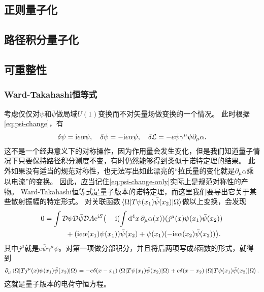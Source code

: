 \subsection{正则量子化}

\subsection{路径积分量子化}

\subsection{可重整性}

\subsubsection{Ward-Takahashi恒等式}

考虑仅仅对$\psi$和$\bar{\psi}$做局域$U(1)$变换而不对矢量场做变换的一个情况。
此时根据\eqref{eq:psi-change}，有
\begin{equation}
    \var{\psi} = \mathrm{i} e \alpha \psi, \quad \var{\bar{\psi}} = - \mathrm{i} e \alpha \bar{\psi}, \quad \var{\mathcal{L}} = - e \bar{\psi} \gamma^\mu \psi \partial_\mu \alpha.
    \label{eq:psi-change-only}
\end{equation}
这不是一个经典意义下的对称操作，因为作用量会发生变化，但是我们知道量子情况下只要保持路径积分测度不变，有时仍然能够得到类似于诺特定理的结果。
此外如果没有适当的规范对称性，也无法写出如此漂亮的“拉氏量的变化就是$\partial_\mu \alpha$乘以电流”的变换。
因此，应当记住\eqref{eq:psi-change-only}实际上是规范对称性的产物。
Ward-Takahashi恒等式是量子版本的诺特定理，而这里我们要导出它关于某些散射振幅的特定形式。
对关联函数$\mel{\Omega}{T \psi(x_1) \bar{\psi}(x_2)}{\Omega}$做以上变换，会发现
\[
    \begin{aligned}
        0 &= \int \mathcal{D} \psi \mathcal{D} \bar{\psi} \mathcal{D} A \mathrm{e}^{\mathrm{i} S} \big( - \mathrm{i} (\int \dd[4]{x} \partial_\mu \alpha(x)) (j^\mu(x) \psi(x_1) \bar{\psi}(x_2) ) \\
        & \quad \quad \quad + (\mathrm{i} e \alpha(x_1) \psi(x_1)) \bar{\psi}(x_2) + \psi(x_1)(- \mathrm{i} e \alpha(x_2) \bar{\psi}(x_2)) \big).
    \end{aligned}
\]
其中$j^\mu$就是$e \bar{\psi} \gamma^\mu \psi$。对第一项做分部积分，并且将后两项写成$\delta$函数的形式，就得到
\begin{equation}
    \partial_\mu \mel{\Omega}{T j^\mu(x) \psi(x_1) \bar{\psi}(x_2)}{\Omega} = - e \delta(x - x_1) \mel{\Omega}{T \psi(x_1) \bar{\psi}(x_2)}{\Omega} + e \delta(x - x_2) \mel{\Omega}{T \psi(x_1) \bar{\psi}(x_2)}{\Omega}.
\end{equation}
这就是量子版本的电荷守恒方程。


